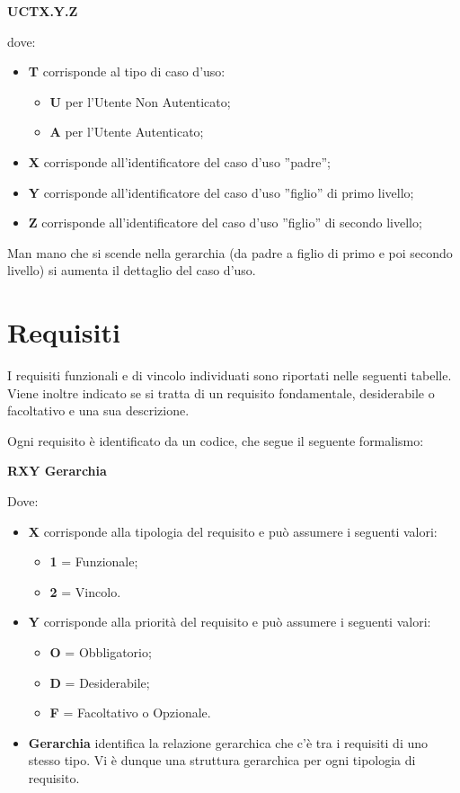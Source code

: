 \begin{center}
\textbf{UCTX.Y.Z}
\end{center}
dove:
\begin{itemize}
\item \textbf{T} corrisponde al tipo di caso d'uso:
	\begin{itemize}
	\item \textbf{U} per l'Utente Non Autenticato;
	\item \textbf{A} per l'Utente Autenticato;
	\end{itemize}
\item \textbf{X} corrisponde all'identificatore del caso d'uso ''padre'';
\item \textbf{Y} corrisponde all'identificatore del caso d'uso ''figlio'' di primo livello;
\item \textbf{Z} corrisponde all'identificatore del caso d'uso ''figlio'' di secondo livello;
\end{itemize}
Man mano che si scende nella gerarchia (da padre a figlio di primo e poi secondo livello) si aumenta il dettaglio del caso d'uso.



\section{Requisiti}
I requisiti funzionali e di vincolo individuati sono riportati nelle seguenti tabelle. Viene inoltre indicato se si tratta di un requisito fondamentale, desiderabile o facoltativo e una sua descrizione.

Ogni requisito è identificato da un codice, che segue il seguente formalismo:
\begin{center}
		\textbf{RXY Gerarchia}
\end{center}

Dove:
\begin{itemize}
 \item \textbf{X} corrisponde alla tipologia del requisito e può assumere i seguenti valori:
		\begin{itemize}
		 \item[] \textbf{1} = Funzionale;
		 \item[] \textbf{2} = Vincolo.
		\end{itemize}

 \item \textbf{Y} corrisponde alla priorità del requisito e può assumere i seguenti valori:
		\begin{itemize}
		 \item[] \textbf{O} = Obbligatorio;
		 \item[] \textbf{D} = Desiderabile;
		 \item[] \textbf{F} = Facoltativo o Opzionale.
		\end{itemize}

 \item \textbf{Gerarchia} identifica la relazione gerarchica che c'è tra i requisiti di uno stesso tipo. Vi è dunque una struttura gerarchica per ogni tipologia di requisito.
\end{itemize}

